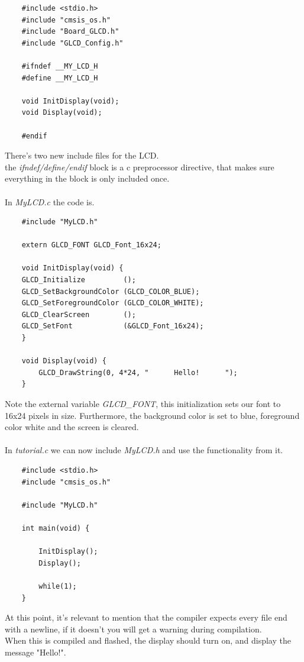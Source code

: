 \documentclass{article}
\begin{document}
\begin{lstlisting}
    #include <stdio.h>
    #include "cmsis_os.h"
    #include "Board_GLCD.h"
    #include "GLCD_Config.h"

    #ifndef __MY_LCD_H
    #define __MY_LCD_H

    void InitDisplay(void);
    void Display(void);

    #endif
\end{lstlisting}
There's two new include files for the LCD.\\
the \textit{ifndef/define/endif} block is a c preprocessor directive, that makes
sure everything in the block is only included once.\\
\\
In \textit{MyLCD.c} the code is.
\begin{lstlisting}
    #include "MyLCD.h"

    extern GLCD_FONT GLCD_Font_16x24;

    void InitDisplay(void) {
    GLCD_Initialize         ();
    GLCD_SetBackgroundColor (GLCD_COLOR_BLUE);
    GLCD_SetForegroundColor (GLCD_COLOR_WHITE);
    GLCD_ClearScreen        ();
    GLCD_SetFont            (&GLCD_Font_16x24);
    }

    void Display(void) {
        GLCD_DrawString(0, 4*24, "      Hello!      ");
    }
\end{lstlisting}
Note the external variable \textit{GLCD\_FONT}, this initialization sets our
font to 16x24 pixels in size. Furthermore, the background color is set to blue,
foreground color white and the screen is cleared.\\
\\
In \textit{tutorial.c} we can now include \textit{MyLCD.h} and use the functionality
from it.
\begin{lstlisting}
    #include <stdio.h>
    #include "cmsis_os.h"

    #include "MyLCD.h"

    int main(void) {
        
        InitDisplay();
        Display();

        while(1);
    }    
\end{lstlisting}
At this point, it's relevant to mention that the compiler expects every file
end with a newline, if it doesn't you will get a warning during compilation.\\
When this is compiled and flashed, the display should turn on, and display the message "Hello!".

\newpage
\end{document}
